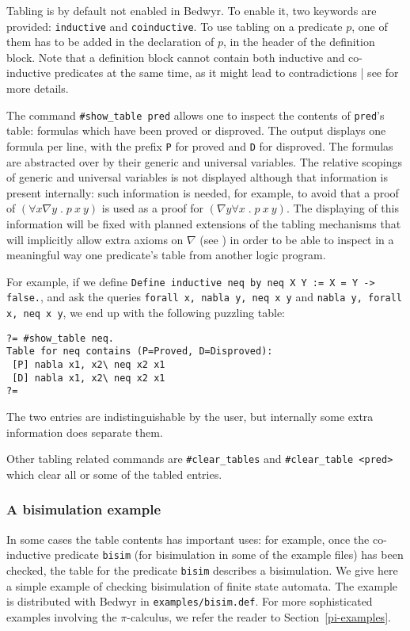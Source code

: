 \documentclass{article}
\newcommand{\qs}{\; . \;}
\begin{document}
Tabling is by default not enabled in Bedwyr. To enable it, two keywords
are provided: \texttt{inductive} and \texttt{coinductive}.
To use tabling on a predicate $p$, one of them has to be added in the
declaration of $p$, in the header of the definition block.
Note that a definition block cannot contain both inductive and
co-inductive predicates at the same time, as it might lead to
contradictions | see \cite{momigliano03types} for more details.

The command \verb/#show_table pred/ allows one to inspect the contents of
\verb.pred.'s table: formulas which have been proved or disproved. The
output displays one formula per line, with the prefix \verb.P. for
proved and \verb.D. for disproved. The formulas are abstracted over by
their generic and universal variables. The relative scopings of generic
and universal variables is not displayed although that information is
present internally: such information is needed, for example, to avoid
that a proof of $(\forall x\nabla y\qs p~x~y)$ is used as a proof for
$(\nabla y\forall x\qs p~x~y)$.  The displaying of this information will
be fixed with planned extensions of the tabling mechanisms that will
implicitly allow extra axioms on $\nabla$ (see \cite{tiu06lfmtp}) in
order to be able to inspect in a meaningful way one predicate's table
from another logic program.

For example, if we define \texttt{Define inductive neq by neq X Y := X =
Y -> false.}, and ask the queries \texttt{forall x, nabla y, neq x y}
and \texttt{nabla y, forall x, neq x y}, we end up with the following
puzzling table:
\begin{verbatim}
?= #show_table neq.
Table for neq contains (P=Proved, D=Disproved):
 [P] nabla x1, x2\ neq x2 x1
 [D] nabla x1, x2\ neq x2 x1
?=
\end{verbatim}
The two entries are indistinguishable by the user, but internally some
extra information does separate them.

Other tabling related commands are \verb/#clear_tables/ and
\verb/#clear_table <pred>/ which clear all or some of the tabled entries.

\subsubsection{A bisimulation example}

In some cases the table contents has important uses: for
example, once the co-inductive predicate {\tt bisim} (for bisimulation
in some of the example files) has been checked, the table for the
predicate {\tt bisim} describes a bisimulation.
We give here a simple example of checking bisimulation of finite
state automata.
The example is distributed with Bedwyr in \verb+examples/bisim.def+.
For more sophisticated examples involving the $\pi$-calculus,
we refer the reader to Section~\ref{pi-examples}.
\end{document}

